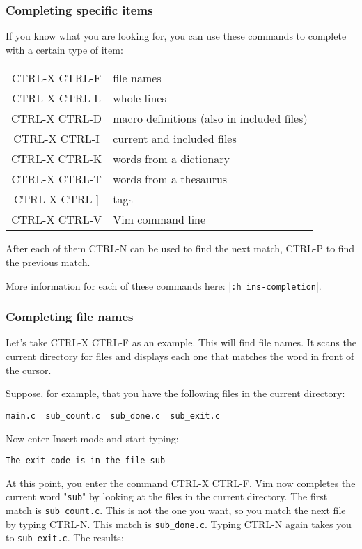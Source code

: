 \subsubsection{Completing specific items}
If you know what you are looking for, you can use these commands to complete with a certain type of item:
\begin{center} \begin{tabular}{c l}
				CTRL-X CTRL-F & file names \\
				CTRL-X CTRL-L & whole lines \\
				CTRL-X CTRL-D & macro definitions (also in included files) \\
				CTRL-X CTRL-I & current and included files \\
				CTRL-X CTRL-K & words from a dictionary \\
				CTRL-X CTRL-T & words from a thesaurus \\
				CTRL-X CTRL-] & tags \\
				CTRL-X CTRL-V & Vim command line \\
\end{tabular} \end{center}
After each of them CTRL-N can be used to find the next match, CTRL-P to find the previous match.

More information for each of these commands here: |\verb!:h ins-completion!|.
\subsubsection{Completing file names}
Let's take CTRL-X CTRL-F as an example.
This will find file names.
It scans the current directory for files and displays each one that matches the word in front of the cursor.

Suppose, for example, that you have the following files in the current directory:

\begin{Verbatim}[samepage=true]
    main.c  sub_count.c  sub_done.c  sub_exit.c
\end{Verbatim}

Now enter Insert mode and start typing:

\begin{Verbatim}[samepage=true]
    The exit code is in the file sub 
\end{Verbatim}

At this point, you enter the command CTRL-X CTRL-F.
Vim now completes the current word "\verb!sub!" by looking at the files in the current directory.
The first match is \verb!sub_count.c!.
This is not the one you want, so you match the next file by typing CTRL-N.
This match is \verb!sub_done.c!.
Typing CTRL-N again takes you to \verb!sub_exit.c!.
The results:

